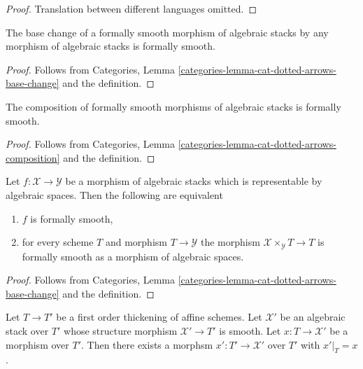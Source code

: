 \begin{proof}
Translation between different languages omitted.
\end{proof}

\begin{lemma}
\label{lemma-base-change-formal-smoothness}
The base change of a formally smooth morphism of algebraic stacks
by any morphism of algebraic stacks is formally smooth.
\end{lemma}

\begin{proof}
Follows from
Categories, Lemma \ref{categories-lemma-cat-dotted-arrows-base-change}
and the definition.
\end{proof}

\begin{lemma}
\label{lemma-composition-formal-smoothness}
The composition of formally smooth morphisms of algebraic stacks
is formally smooth.
\end{lemma}

\begin{proof}
Follows from
Categories, Lemma \ref{categories-lemma-cat-dotted-arrows-composition}
and the definition.
\end{proof}

\begin{lemma}
\label{lemma-formal-smoothness-representable}
Let $f : \mathcal{X} \to \mathcal{Y}$ be a morphism of algebraic stacks
which is representable by algebraic spaces. Then the following are equivalent
\begin{enumerate}
\item $f$ is formally smooth,
\item for every scheme $T$ and morphism $T \to \mathcal{Y}$
the morphism $\mathcal{X} \times_\mathcal{Y} T \to T$
is formally smooth as a morphism of algebraic spaces.
\end{enumerate}
\end{lemma}

\begin{proof}
Follows from
Categories, Lemma \ref{categories-lemma-cat-dotted-arrows-base-change}
and the definition.
\end{proof}

\begin{lemma}
\label{lemma-lift-to-smooth}
Let $T \to T'$ be a first order thickening of affine schemes.
Let $\mathcal{X}'$ be an algebraic stack over $T'$
whose structure morphism $\mathcal{X}' \to T'$ is smooth.
Let $x : T \to \mathcal{X}'$ be a morphism
over $T'$. Then there exists a morphsm $x' : T' \to \mathcal{X}'$
over $T'$ with $x'|_T = x$.
\end{lemma}

